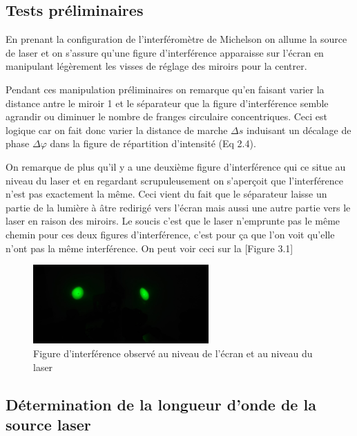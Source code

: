 \documentclass[11pt, openright]{book}
\begin{document}
				\subsection{Tests préliminaires}

					En prenant la configuration de l'interféromètre de Michelson on allume la source de laser et on s'assure qu'une figure d'interférence apparaisse sur l'écran en manipulant légèrement les visses de réglage des miroirs pour la centrer.

					Pendant ces manipulation préliminaires on remarque qu'en faisant varier la distance antre le miroir 1 et le séparateur que la figure d'interférence semble agrandir ou diminuer le nombre de franges circulaire concentriques. Ceci est logique car on fait donc varier la distance de marche $\Delta s$ induisant un décalage de phase $\Delta\varphi$ dans la figure de répartition d'intensité (Eq 2.4).

					On remarque de plus qu'il y a une deuxième figure d'interférence qui ce situe au niveau du laser et en regardant scrupuleusement on s'aperçoit que l'interférence n'est pas exactement la même. Ceci vient du fait que le séparateur laisse un partie de la lumière à âtre redirigé vers l'écran mais aussi une autre partie vers le laser en raison des miroirs. Le soucis c'est que le laser n'emprunte pas le même chemin pour ces deux figures d'interférence, c'est pour ça que l'on voit qu'elle n'ont pas la même interférence. On peut voir ceci sur la [Figure 3.1] 

					\begin{figure}[ht!]
						\centering
						\includegraphics[width=0.6\textwidth]{./object/g4.jpg}
						\caption{Figure d'interférence observé au niveau de l'écran et au niveau du laser}
					\end{figure}

				\subsection{Détermination de la longueur d'onde de la source laser}
\end{document}
